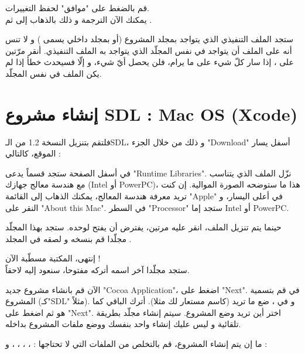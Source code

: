 قم بالضغط على "موافق" لحفظ التغييرات.\\
يمكنك الآن الترجمة و ذلك بالذهاب إلى
ثم
.

ستجد الملف التنفيذي الذي يتواجد بمجلد المشروع (أو بمجلد داخلي يسمى
)
و لا تنس أنه على الملف
أن يتواجد في نفس المجلّد الذي يتواجد به الملف التنفيذي. أنقر مرّتين على
،
 إذا سار كلّ شيء على ما يرام، فلن يحصل أيّ شيء، و إلّا فسيحدث خطأ إذا لم يكن الملف
في نفس المجلّد.

\section{إنشاء مشروع \textenglish{SDL} : \textenglish{Mac OS} (\textenglish{Xcode})}

فلتقم بتنزيل النسخة 1.2 من الـ\textenglish{SDL}،
و ذلك من خلال الجزء
"\textenglish{Download}"
أسفل يسار الموقع، كالتالي :

في أسفل الصفحة ستجد قسماً يدعى 
"\textenglish{Runtime Libraries}".
نزّل الملف الذي يتناسب مع هندسة معالج جهازك
(\textenglish{Intel} أو \textenglish{PowerPC})،
 هذا ما ستوضحه الصورة الموالية. إن كنت تريد معرفة هندسة المعالج، يمكنك الذهاب إلى القائمة 
"\textenglish{Apple}"
في أعلى اليسار، و النقر على 
"\textenglish{About this Mac}".
في السطر 
"\textenglish{Processor}"
ستجد إما
\textenglish{Intel} أو \textenglish{PowerPC}.


حينما يتم تنزيل الملف، انقر عليه مرتين، يفترض أن يفتح لوحده. ستجد بهذا المجلّد مجلّدا
قم بنسخه و لصقه في المجلد 
.

إنتهى، المكتبة مسطّبة الآن !\\
ستجد مجلّدا آخر اسمه 
أتركه مفتوحا، سنعود إليه لاحقاً.

الآن قم بانشاء مشروع جديد
"\textenglish{Cocoa Application}"،
اضغط على
"\textenglish{Next}".
في 
قم بتسمية المشروع (كـ"\textenglish{SDL}"
مثلاً). و في 
،
ضع ما تريد (كاسم مستعار لك مثلا). أترك الباقي كما هو ثم اضغط على 
"\textenglish{Next}".
اختر أين تريد وضع المشروع. سيتم إنشاء مجلّد بطريقة تلقائية و ليس عليك إنشاء واحد بنفسك ووضع ملفات المشروع بداخله.

ما إن يتم إنشاء المشروع، قم بالتخلص من الملفات التي لا تحتاجها :
، ، ، ،  و  :

